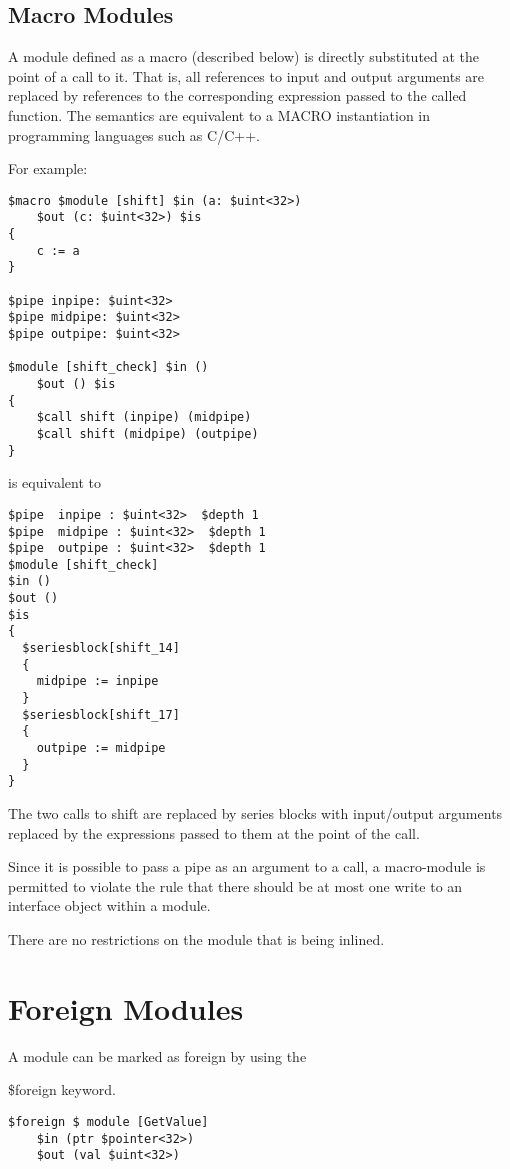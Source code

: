 \documentclass{article}
\begin{document}
\subsection{Macro Modules}

A module defined as a macro (described below)
is directly substituted at the point of a call
to it.  That is, all references to input and
output arguments
are replaced by references to the corresponding
expression passed to the called function.  
The semantics are equivalent to a MACRO instantiation
in programming languages such as C/C++.

For example:
\begin{verbatim}
$macro $module [shift] $in (a: $uint<32>) 
    $out (c: $uint<32>) $is
{
    c := a 
}  

$pipe inpipe: $uint<32>
$pipe midpipe: $uint<32>
$pipe outpipe: $uint<32>

$module [shift_check] $in () 
    $out () $is
{
    $call shift (inpipe) (midpipe)
    $call shift (midpipe) (outpipe)
}

\end{verbatim}
is equivalent to 
\begin{verbatim}
$pipe  inpipe : $uint<32>  $depth 1 
$pipe  midpipe : $uint<32>  $depth 1 
$pipe  outpipe : $uint<32>  $depth 1 
$module [shift_check]
$in ()
$out ()
$is
{
  $seriesblock[shift_14] 
  {
    midpipe := inpipe
  }
  $seriesblock[shift_17] 
  {
    outpipe := midpipe
  }
}
\end{verbatim}
The two calls to shift are replaced by
series blocks with input/output arguments
replaced by the expressions passed to them
at the point of the call.

Since it is possible to pass a pipe as an 
argument to a call, a macro-module is permitted
to violate the rule that there should
be at most one write to an interface object
within a module.

There are no restrictions on the
module that is being inlined.

\section{Foreign Modules}


A module can be marked as foreign by using the

\$foreign keyword.
\begin{verbatim}
$foreign $ module [GetValue]
	$in (ptr $pointer<32>)
	$out (val $uint<32>)
\end{verbatim}
\end{document}
